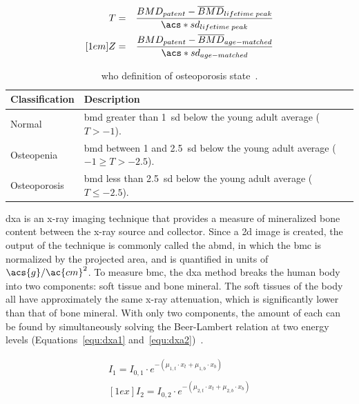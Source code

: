 \begin{eqnarray}
	\label{equ:tscore}
	T &=& \frac{BMD_{patent} - \overline{BMD}_{lifetime\; peak}}{\acs*{sd}_{lifetime\; peak}} \\ [1em]
	\label{equ:zscore}
	Z &=& \frac{BMD_{patent} - \overline{BMD}_{age-matched}}{\acs*{sd}_{age-matched}}
\end{eqnarray}

\begin{table}
	\caption[\acs*{who} osteoporosis definitions]{\acs*{who} definition of osteoporosis state~\citep{who_study_group_assessment_1994}.}		
	\label{tab:op}
	\begin{tabularx}{0.9\textwidth}{l X}
		\toprule
		\textbf{Classification} & \textbf{Description} \\ \midrule
		Normal                  &  \ac{bmd} greater than 1~\acs{sd} below the young adult average ($T > -1$). \\
		Osteopenia              &  \ac{bmd} between 1 and 2.5~\acs{sd} below the young adult average ($-1 \geq T > -2.5 $).\\
		Osteoporosis            &  \ac{bmd} less than 2.5~\acs{sd} below the young adult average ($T \leq -2.5$).\\ \bottomrule
	\end{tabularx} 
\end{table}

\ac{dxa} is an x-ray imaging technique that provides a measure of mineralized bone content between the x-ray source and collector.
Since a \ac{2d} image is created, the output of the technique is commonly called the \ac{abmd}, in which the \ac{bmc} is normalized by the projected area, and is quantified in units of~$\acs{g}/\ac{cm}^2$.
To measure \ac{bmc}, the \ac{dxa} method breaks the human body into two components: soft tissue and bone mineral.
The soft tissues of the body all have approximately the same x-ray attenuation, which is significantly lower than that of bone mineral.
With only two components, the amount of each can be found by simultaneously solving the Beer-Lambert relation at two energy levels (Equations~\ref{equ:dxa1} and~\ref{equ:dxa2})~\citep{jacobson_x-ray_1964, gustafsson_x_1974}.

\begingroup
\setlength{\abovedisplayskip}{-2ex}
\begin{eqnarray}
\label{equ:dxa1}
	I_1 = I_{0,1} \cdot e^{-(\mu_{1,t} \cdot x_t + \mu_{1,b} \cdot x_b)} \\ [1ex]
\label{equ:dxa2}
	I_2 = I_{0,2} \cdot e^{-(\mu_{2,t} \cdot x_t + \mu_{2,b} \cdot x_b)} 
\end{eqnarray}
\endgroup

